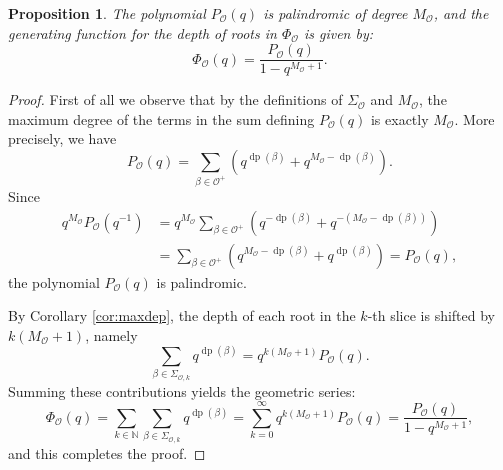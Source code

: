\documentclass{amsart}
\newtheorem{Proposition}[Theorem]{Proposition}
\theoremstyle{definition}
\newcommand{\dep}{\operatorname{dp}}
\newcommand{\mo}{\mathcal{O}}
\begin{document}
\begin{Proposition} \label{prop:palindrom}
The polynomial $P_{\mo}(q)$ is palindromic of degree $M_\mo$, and the generating function for the depth of roots in $\Phi_{\mo}$ is given by:
\begin{equation}
    \Phi_{\mo}(q) = \frac{P_{\mo}(q)}{1 - q^{M_{\mo}+1}}.
\end{equation}
\end{Proposition} 
\begin{proof}
First of all we observe that by the definitions of $\Sigma_{\mo}$ and $M_{\mo}$, the maximum degree of the terms in the sum defining $P_{\mo}(q)$ is exactly $M_{\mo}$. More precisely, we have
$$P_{\mo}(q)=\sum_{\beta\in \mo^+} (q^{\dep(\beta)}+q^{M_\mo-\dep(\beta)}).$$ 
Since 
\begin{align*}
q^{M_\mo}P_\mo(q^{-1}) &= q^{M_\mo} \sum_{\beta\in \mo^+} (q^{-\dep(\beta)} + q^{-(M_\mo-\dep(\beta))}) \\
&= \sum_{\beta\in \mo^+} (q^{M_\mo-\dep(\beta)} + q^{\dep(\beta)}) = P_\mo(q),
\end{align*}
the polynomial $P_{\mo}(q)$ is palindromic. 

By Corollary \ref{cor:maxdep}, the depth of each root in the $k$-th slice is shifted by $k(M_{\mo}+1)$, namely 
$$\sum_{\beta\in\Sigma_{\mo,k}} q^{\dep(\beta)}=q^{k(M_\mo +1)}P_\mo(q).$$
Summing these contributions yields the geometric series:
\[
\Phi_{\mo}(q) = \sum_{k\in\mathbb{N}}\sum_{\beta\in\Sigma_{\mo,k}} q^{\dep(\beta)}=\sum_{k=0}^{\infty} q^{k(M_{\mo}+1)} P_{\mo}(q) = \frac{P_{\mo}(q)}{1 - q^{M_{\mo}+1}},
\]
and this completes the proof.
\end{proof}

\end{document}
